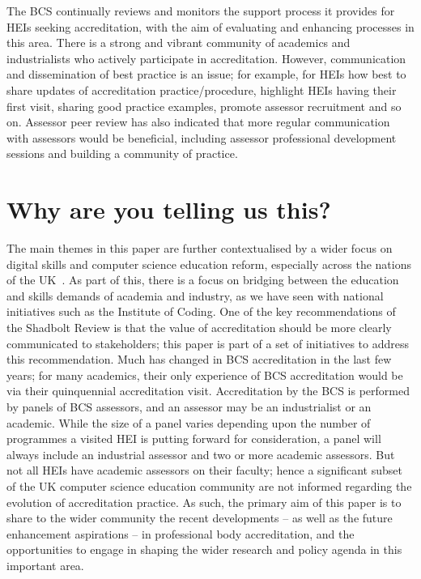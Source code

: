 \documentclass[sigconf]{acmart}
\begin{document}
The BCS continually reviews and monitors the support process it
provides for HEIs seeking accreditation, with the aim of evaluating
and enhancing processes in this area. There is a strong and vibrant
community of academics and industrialists who actively participate in
accreditation. However, communication and dissemination of best
practice is an issue; for example, for HEIs how best to share updates
of accreditation practice/procedure, highlight HEIs having their first
visit, sharing good practice examples, promote assessor recruitment
and so on. Assessor peer review has also indicated that more regular
communication with assessors would be beneficial, including assessor
professional development sessions and building a community of
practice.

\section{Why are you telling us this?}	

The main themes in this paper are further contextualised by a wider
focus on digital skills and computer science education reform,
especially across the nations of the
UK~\cite{brown-et-al:toce2014,tryfonas+crick:petra2018}. As part of
this, there is a focus on bridging between the education and skills
demands of academia and industry, as we have seen with national
initiatives such as the Institute of Coding. One of the key
recommendations of the Shadbolt Review is that the value of
accreditation should be more clearly communicated to stakeholders;
this paper is part of a set of initiatives to address this
recommendation. Much has changed in BCS accreditation in the last few
years; for many academics, their only experience of BCS accreditation
would be via their quinquennial accreditation visit. Accreditation by
the BCS is performed by panels of BCS assessors, and an assessor may
be an industrialist or an academic. While the size of a panel varies
depending upon the number of programmes a visited HEI is putting
forward for consideration, a panel will always include an industrial
assessor and two or more academic assessors. But not all HEIs have
academic assessors on their faculty; hence a significant subset of the
UK computer science education community are not informed regarding the
evolution of accreditation practice. As such, the primary aim of this
paper is to share to the wider community the recent developments -- as
well as the future enhancement aspirations -- in professional body
accreditation, and the opportunities to engage in shaping the wider
research and policy agenda in this important area.
\end{document}
